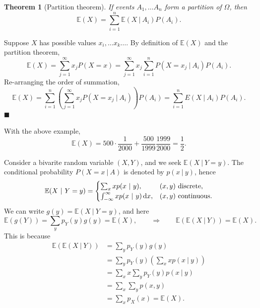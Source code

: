\documentclass[letter-paper]{tufte-book}
\newtheorem{theorem}{\color{pastel-blue}Theorem}[section]
\newenvironment{proof}[1][Proof]{\begin{trivlist}
\item[\hskip \labelsep {\bfseries #1}]}{\end{trivlist}}
\newenvironment{example}[1][Example]{\begin{trivlist}
\item[\hskip \labelsep {\bfseries #1}]}{\end{trivlist}}
\newcommand{\qed}{\hfill$\blacksquare$}
\begin{document}
\begin{theorem}[Partition theorem]
  If events $A_1,\ldots A_n$ form a partition of $\Omega$, then
  \begin{equation*}
    \mathbb{E}(X) = \sum_{i=1}^n \mathbb{E}(X\ |\ A_i) P(A_i).
  \end{equation*}
\end{theorem}
\begin{proof}
  Suppose $X$ has possible values $x_i,\ldots x_k\ldots$. By definition of
  $\mathbb{E}(X)$ and the partition theorem,
  \begin{equation*}
    \mathbb{E}(X) = \sum_{j=1}^\infty x_j P(X=x) 
    = \sum_{j=1}^\infty x_j \sum_{i=1}^n P(X=x_j\ |\ A_i)P(A_i).
  \end{equation*}
  Re-arranging the order of summation,
  \begin{equation*}
    \mathbb{E}(X) = 
      \sum_{i=1}^n \left(\sum_{j=1}^\infty x_jP(X=x_j\ |\ A_i)\right)P(A_i)
    = \sum_{i=1}^n E(X\ |\ A_i) P(A_i).
  \end{equation*}
  \qed
\end{proof}

\begin{example}
  With the above example,
  \begin{equation*}
    \mathbb{E}(X) = 500\cdot\frac{1}{2000} + \frac{500}{1999}\frac{1999}{2000}
    = \frac{1}{2}.
  \end{equation*}
\end{example}

Consider a bivarite random variable $(X,Y)$, and we seek $\mathbb{E}(X\ |\
Y=y)$. The conditional probability $P(X=x\ |\ A)$ is denoted by $p(x\ |\ y)$,
hence
\begin{equation*}
  \mathbb{E}(X\ |\ Y=y) =
  \begin{cases}
    \sum_x xp(x\ |\ y), & (x,y)\ \textnormal{discrete},\\
    \int_{-\infty}^\infty xp(x\ |\ y)\, \mathrm{d}x, & (x,y)\
    \textnormal{continuous}.
  \end{cases}
\end{equation*}
We can write $g(y) = \mathbb{E}(X\ |\ Y=y)$, and here
\begin{equation*}
  \mathbb{E}(g(Y)) = \sum_y p_Y(y) g(y) = \mathbb{E}(X),
  \qquad\Rightarrow\qquad
  \mathbb{E}(\mathbb{E}(X\ |\ Y)) = \mathbb{E}(X).
\end{equation*}
This is because
\begin{align*}
  \mathbb{E}(\mathbb{E}(X\ |\ Y)) & = \sum_y p_Y(y) g(y) \\
    &= \sum_y p_Y(y) \left(\sum_x xp(x\ |\ y)\right) \\
    &= \sum_x x \sum_y p_Y(y) p(x\ |\ y) \\
    &= \sum_x \sum_y p(x,y) \\
    &= \sum_x p_X(x) = \mathbb{E}(X).
\end{align*}
\end{document}
